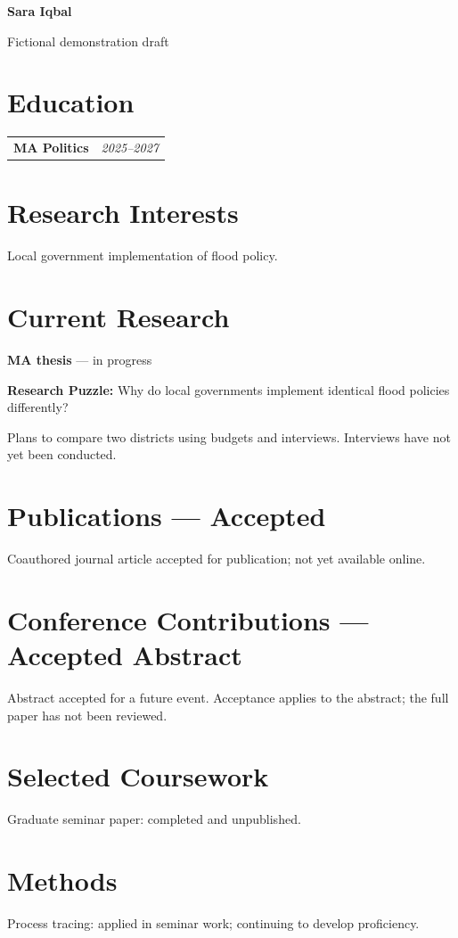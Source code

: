\documentclass[10pt,a4paper]{article}
\makeatletter
\newcommand{\datedline}[2]{%
  \begin{tabularx}{\textwidth}{@{}Xr@{}}
    #1 & \textit{#2}
  \end{tabularx}%
}
\newcommand{\puzzleline}[1]{%
  \textbf{Research Puzzle:} #1\par\vspace{1.8pt}
}
\makeatother
\begin{document}
\fontsize{10.2pt}{11.3pt}\selectfont
\begin{center}{\fontsize{19pt}{20pt}\selectfont\bfseries Sara Iqbal}\par\small Fictional demonstration draft\end{center}
\section{Education}
\datedline{\textbf{MA Politics}}{2025--2027}
\section{Research Interests}
Local government implementation of flood policy.
\section{Current Research}
\textbf{MA thesis} --- in progress\par
\puzzleline{Why do local governments implement identical flood policies differently?}
Plans to compare two districts using budgets and interviews. Interviews have not yet been conducted.
\section{Publications --- Accepted}
Coauthored journal article accepted for publication; not yet available online.
\section{Conference Contributions --- Accepted Abstract}
Abstract accepted for a future event. Acceptance applies to the abstract; the full paper has not been reviewed.
\section{Selected Coursework}
Graduate seminar paper: completed and unpublished.
\section{Methods}
Process tracing: applied in seminar work; continuing to develop proficiency.
\end{document}
